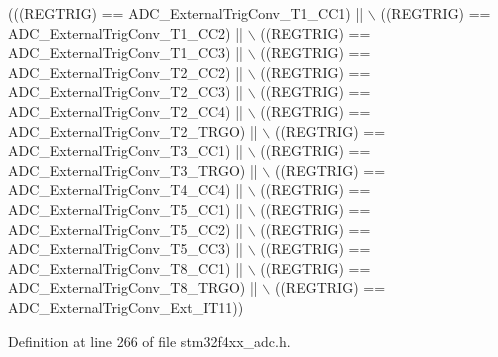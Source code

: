 \begin{DoxyCode}
(((REGTRIG) == ADC\_ExternalTrigConv\_T1\_CC1) || \(\backslash\)
                                  ((REGTRIG) == ADC\_ExternalTrigConv\_T1\_CC2) || \(\backslash\)
                                  ((REGTRIG) == ADC\_ExternalTrigConv\_T1\_CC3) || \(\backslash\)
                                  ((REGTRIG) == ADC\_ExternalTrigConv\_T2\_CC2) || \(\backslash\)
                                  ((REGTRIG) == ADC\_ExternalTrigConv\_T2\_CC3) || \(\backslash\)
                                  ((REGTRIG) == ADC\_ExternalTrigConv\_T2\_CC4) || \(\backslash\)
                                  ((REGTRIG) == ADC\_ExternalTrigConv\_T2\_TRGO) || \(\backslash\)
                                  ((REGTRIG) == ADC\_ExternalTrigConv\_T3\_CC1) || \(\backslash\)
                                  ((REGTRIG) == ADC\_ExternalTrigConv\_T3\_TRGO) || \(\backslash\)
                                  ((REGTRIG) == ADC\_ExternalTrigConv\_T4\_CC4) || \(\backslash\)
                                  ((REGTRIG) == ADC\_ExternalTrigConv\_T5\_CC1) || \(\backslash\)
                                  ((REGTRIG) == ADC\_ExternalTrigConv\_T5\_CC2) || \(\backslash\)
                                  ((REGTRIG) == ADC\_ExternalTrigConv\_T5\_CC3) || \(\backslash\)
                                  ((REGTRIG) == ADC\_ExternalTrigConv\_T8\_CC1) || \(\backslash\)
                                  ((REGTRIG) == ADC\_ExternalTrigConv\_T8\_TRGO) || \(\backslash\)
                                  ((REGTRIG) == ADC\_ExternalTrigConv\_Ext\_IT11))
\end{DoxyCode}


Definition at line 266 of file stm32f4xx\-\_\-adc.\-h.

